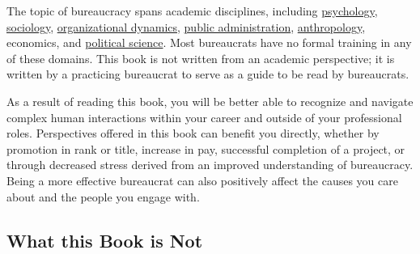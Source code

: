 The topic of bureaucracy spans academic disciplines, including 
\href{https://en.wikipedia.org/wiki/Psychology}{psychology},
\iftoggle{WPinmargin}{\marginpar{$>$Wikipedia: psychology}}{}
\href{https://en.wikipedia.org/wiki/Sociology}{sociology},
\href{https://en.wikipedia.org/wiki/Organizational_behavior}{organizational dynamics},
\href{https://en.wikipedia.org/wiki/Public_administration}{public administration}, 
\href{https://en.wikipedia.org/wiki/Anthropology}{anthropology},
economics, and  
\href{https://en.wikipedia.org/wiki/Political_science}{political science}. 
Most bureaucrats have no formal training in any of these domains. This book is not written from an academic perspective; it is written by a practicing bureaucrat to serve as a guide to be read by bureaucrats. 



As a result of reading this book, you will be better able to recognize and navigate complex human interactions within your career and outside of your professional roles. Perspectives offered in this book can benefit you directly, whether by promotion in rank or title, increase in pay, successful completion of a project, or through decreased stress derived from an improved understanding of  bureaucracy. Being a more effective bureaucrat can also positively affect the causes you care about and the people you engage with.


\subsection*{What this Book is Not}

